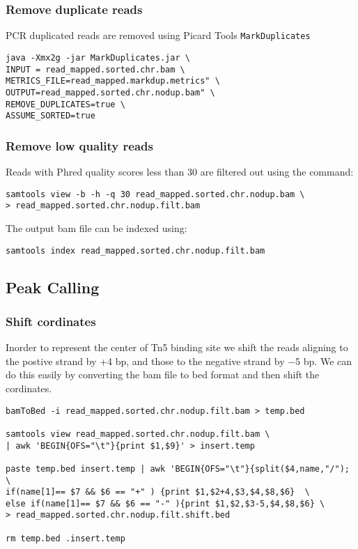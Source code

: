 \documentclass[10pt]{article}
\newcommand{\prog}[1]{\texttt{#1}}
\begin{document}
\subsubsection{Remove duplicate reads} PCR duplicated reads are removed using Picard Tools \prog{MarkDuplicates}
\begin{verbatim}
java -Xmx2g -jar MarkDuplicates.jar \
INPUT = read_mapped.sorted.chr.bam \
METRICS_FILE=read_mapped.markdup.metrics" \
OUTPUT=read_mapped.sorted.chr.nodup.bam" \
REMOVE_DUPLICATES=true \
ASSUME_SORTED=true
\end{verbatim}
\subsubsection{Remove low quality reads} Reads with Phred quality scores less than 30 are filtered out using the command:
\begin{verbatim}
samtools view -b -h -q 30 read_mapped.sorted.chr.nodup.bam \
> read_mapped.sorted.chr.nodup.filt.bam
\end{verbatim}
The output bam file can be indexed using:
\begin{verbatim}
samtools index read_mapped.sorted.chr.nodup.filt.bam
\end{verbatim} 
\subsection{Peak Calling}
\subsubsection{Shift cordinates} Inorder to represent the center of Tn5 binding site we shift the reads aligning to the postive strand by +4 bp, and those to the negative strand by −5 bp. We can do this easily by converting the bam file to bed format and then shift the cordinates.
\begin{verbatim}
bamToBed -i read_mapped.sorted.chr.nodup.filt.bam > temp.bed

samtools view read_mapped.sorted.chr.nodup.filt.bam \
| awk 'BEGIN{OFS="\t"}{print $1,$9}' > insert.temp

paste temp.bed insert.temp | awk 'BEGIN{OFS="\t"}{split($4,name,"/"); \
if(name[1]== $7 && $6 == "+" ) {print $1,$2+4,$3,$4,$8,$6}  \
else if(name[1]== $7 && $6 == "-" ){print $1,$2,$3-5,$4,$8,$6} \
> read_mapped.sorted.chr.nodup.filt.shift.bed

rm temp.bed .insert.temp
\end{verbatim}
\end{document}
